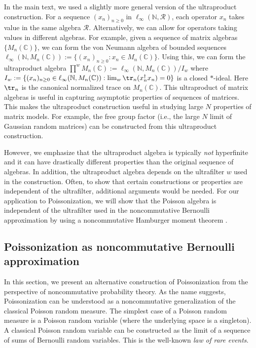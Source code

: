 \documentclass[a4paper,11pt]{article}
\theoremstyle{definition}
\numberwithin{equation}{section}
\begin{document}
In the main text, we used a slightly more general version of the ultraproduct construction. For a sequence $(x_n)_{n\geq 0}$ in $\ell_\infty(\mathbb{N}, \mathcal{R})$, each operator $x_n$ takes value in the same algebra $\mathcal{R}$. Alternatively, we can allow for operators taking values in different algebras. For example, given a sequence of matrix algebras $\{M_n(\mathbb{C})\}$, we can form the von Neumann algebra of bounded sequences $\ell_\infty(\mathbb{N}, M_n(\mathbb{C})) := \{(x_n)_{n\geq 0}: x_n\in M_n(\mathbb{C})\}$. Using this, we can form the ultraproduct algebra $\prod^w M_n(\mathbb{C}) := \ell_\infty(\mathbb{N}, M_n(\mathbb{C})) / I_w$ where $I_w := \{(x_n)_{n\geq 0}\in \ell_\infty(\mathbb{N}, M_n(\mathbb{C})):\lim_w\tr_n(x_n^\dagger x_n) = 0\}$ is a closed $*$-ideal. Here $\tr_n$ is the canonical normalized trace on $M_n(\mathbb{C})$. This ultraproduct of matrix algebras is useful in capturing asymptotic properties of sequences of matrices. This makes the ultraproduct construction useful in studying large $N$ properties of matrix models. For example, the free group factor (i.e., the large $N$ limit of Gaussian random matrices) can be constructed from this ultraproduct construction. 

However, we emphasize that the ultraproduct algebra is typically \textit{not} hyperfinite and it can have drastically different properties than the original sequence of algebras. In addition, the ultraproduct algebra depends on the ultrafilter $w$ used in the construction. Often, to show that certain constructions or properties are independent of the ultrafilter, additional arguments would be needed. For our application to Poissonization, we will show that the Poisson algebra is independent of the ultrafilter used in the noncommutative Bernoulli approximation by using a noncommutative Hamburger moment theorem \cite{MAW}. 

\subsection{Poissonization as noncommutative Bernoulli approximation}\label{subsection:qpoiss}

In this section, we present an alternative construction of Poissonization from the perspective of noncommutative probability theory. As the name suggests, Poissonization can be understood as a noncommutative generalization of the classical Poisson random measure. The simplest case of a Poisson random measure is a Poisson random variable (where the underlying space is a singleton). A classical Poisson random variable can be constructed as the limit of a sequence of sums of Bernoulli random variables. This is the well-known \textit{law of rare events}.
\end{document}

